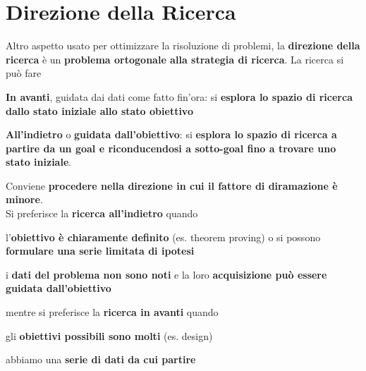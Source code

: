 \documentclass[10pt]{book}
\begin{document}
\section{Direzione della Ricerca}
Altro aspetto usato per ottimizzare la risoluzione di problemi, la \textbf{direzione della ricerca} è un \textbf{problema ortogonale alla strategia di ricerca}. La ricerca si può fare
\begin{list}{}{}
	\item \textbf{In avanti}, guidata dai dati come fatto fin'ora: si \textbf{esplora lo spazio di ricerca dallo stato iniziale allo stato obiettivo}
	\item \textbf{All'indietro} o \textbf{guidata dall'obiettivo}: si \textbf{esplora lo spazio di ricerca a partire da un goal e riconducendosi a sotto-goal fino a trovare uno stato iniziale}.
\end{list}
Conviene \textbf{procedere nella direzione in cui il fattore di diramazione è minore}.\\
Si preferisce la \textbf{ricerca all'indietro} quando
\begin{list}{}{}
	\item l'\textbf{obiettivo è chiaramente definito} (es. theorem proving) o si possono \textbf{formulare una serie limitata di ipotesi}
	\item i \textbf{dati del problema non sono noti} e la loro \textbf{acquisizione può essere guidata dall'obiettivo}
\end{list}
mentre si preferisce la \textbf{ricerca in avanti} quando
\begin{list}{}{}
	\item gli \textbf{obiettivi possibili sono molti} (es. design)
	\item abbiamo una \textbf{serie di dati da cui partire}
\end{list}
\pagebreak
\end{document}

